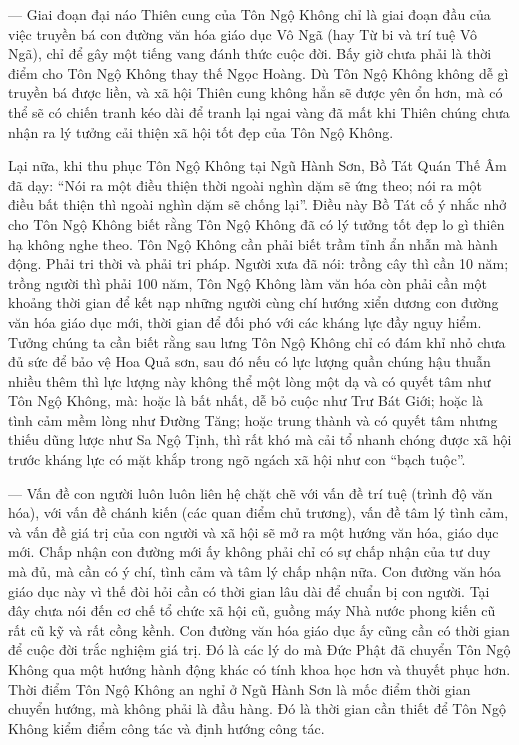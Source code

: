 — Giai đoạn đại náo Thiên cung của Tôn Ngộ Không chỉ là giai đoạn đầu của việc truyền bá con đường văn hóa giáo dục Vô Ngã (hay Từ bi và trí tuệ Vô Ngã), chỉ để gây một tiếng vang đánh thức cuộc đời. Bấy giờ chưa phải là thời điểm cho Tôn Ngộ Không thay thế Ngọc Hoàng. Dù Tôn Ngộ Không không dễ gì truyền bá được liền, và xã hội Thiên cung không hẳn sẽ được yên ổn hơn, mà có thể sẽ có chiến tranh kéo dài để tranh lại ngai vàng đã mất khi Thiên chúng chưa nhận ra lý tưởng cải thiện xã hội tốt đẹp của Tôn Ngộ Không.

Lại nữa, khi thu phục Tôn Ngộ Không tại Ngũ Hành Sơn, Bồ Tát Quán Thế Âm đã dạy: ``Nói ra một điều thiện thời ngoài nghìn dặm sẽ ứng theo; nói ra một điều bất thiện thì ngoài nghìn dặm sẽ chống lại''. Điều này Bồ Tát cố ý nhắc nhở cho Tôn Ngộ Không biết rằng Tôn Ngộ Không đã có lý tưởng tốt đẹp lo gì thiên hạ không nghe theo. Tôn Ngộ Không cần phải biết trầm tỉnh ẩn nhẫn mà hành động. Phải tri thời và phải tri pháp. Người xưa đã nói: trồng cây thì cần 10 năm; trồng người thì phải 100 năm, Tôn Ngộ Không làm văn hóa còn phải cần một khoảng thời gian để kết nạp những người cùng chí hướng xiển dương con đường văn hóa giáo dục mới, thời gian để đối phó với các kháng lực đầy nguy hiểm. Tưởng chúng ta cần biết rằng sau lưng Tôn Ngộ Không chỉ có đám khỉ nhỏ chưa đủ sức để bảo vệ Hoa Quả sơn, sau đó nếu có lực lượng quần chúng hậu thuẫn nhiều thêm thì lực lượng này không thể một lòng một dạ và có quyết tâm như Tôn Ngộ Không, mà: hoặc là bất nhất, dễ bỏ cuộc như Trư Bát Giới; hoặc là tình cảm mềm lòng như Đường Tăng; hoặc trung thành và có quyết tâm nhưng thiếu dũng lược như Sa Ngộ Tịnh, thì rất khó mà cải tổ nhanh chóng được xã hội trước kháng lực có mặt khắp trong ngõ ngách xã hội như con ``bạch tuộc''.

— Vấn đề con người luôn luôn liên hệ chặt chẽ với vấn đề trí tuệ (trình độ văn hóa), với vấn đề chánh kiến (các quan điểm chủ trương), vấn đề tâm lý tình cảm, và vấn đề giá trị của con người và xã hội sẽ mở ra một hướng văn hóa, giáo dục mới. Chấp nhận con đường mới ấy không phải chỉ có sự chấp nhận của tư duy mà đủ, mà cần có ý chí, tình cảm và tâm lý chấp nhận nữa. Con đường văn hóa giáo dục này vì thế đòi hỏi cần có thời gian lâu dài để chuẩn bị con người. Tại đây chưa nói đến cơ chế tổ chức xã hội cũ, guồng máy Nhà nước phong kiến cũ rất cũ kỹ và rất cồng kềnh. Con đường văn hóa giáo dục ấy cũng cần có thời gian để cuộc đời trắc nghiệm giá trị. Đó là các lý do mà Đức Phật đã chuyển Tôn Ngộ Không qua một hướng hành động khác có tính khoa học hơn và thuyết phục hơn. Thời điểm Tôn Ngộ Không an nghỉ ở Ngũ Hành Sơn là mốc điểm thời gian chuyển hướng, mà không phải là đầu hàng. Đó là thời gian cần thiết để Tôn Ngộ Không kiểm điểm công tác và định hướng công tác.

